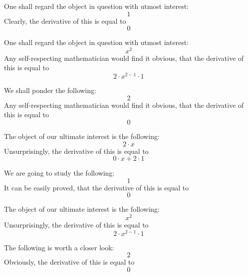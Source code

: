\documentclass{article}
\begin{document}
One shall regard the object in question with utmost interest:
\begin{equation}
1 
\end{equation}
Clearly, the derivative of this is equal to
\begin{equation}
0 
\end{equation}

One shall regard the object in question with utmost interest:
\begin{equation}
x ^{2 } 
\end{equation}
Any self-respecting mathematician would find it obvious, that the derivative of this is equal to
\begin{equation}
2 \cdot x ^{2 - 1 } \cdot 1 
\end{equation}

We shall ponder the following:
\begin{equation}
2 
\end{equation}
Any self-respecting mathematician would find it obvious, that the derivative of this is equal to
\begin{equation}
0 
\end{equation}

The object of our ultimate interest is the following:
\begin{equation}
2 \cdot x 
\end{equation}
Unsurprisingly, the derivative of this is equal to
\begin{equation}
0 \cdot x + 2 \cdot 1 
\end{equation}

We are going to study the following:
\begin{equation}
1 
\end{equation}
It can be easily proved, that the derivative of this is equal to
\begin{equation}
0 
\end{equation}

The object of our ultimate interest is the following:
\begin{equation}
x ^{2 } 
\end{equation}
Unsurprisingly, the derivative of this is equal to
\begin{equation}
2 \cdot x ^{2 - 1 } \cdot 1 
\end{equation}

The following is worth a closer look:
\begin{equation}
2 
\end{equation}
Obviously, the derivative of this is equal to
\begin{equation}
0 
\end{equation}
\end{document}
